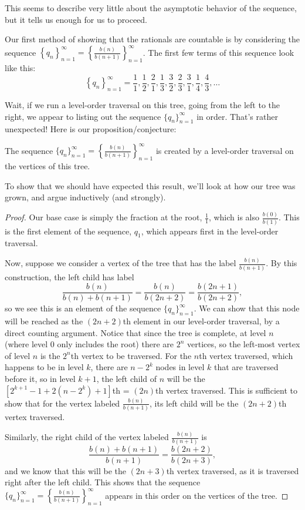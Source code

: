 \documentclass[12pt]{scrartcl}
\begin{document}
This seems to describe very little about the asymptotic behavior of the sequence, but it tells us enough for us to proceed.

Our first method of showing that the rationals are countable is by considering the sequence $\left\{q_n \right\}_{n=1}^\infty = \left\{\frac{b(n)}{b(n+1)}\right\}_{n=1}^\infty$. The first few terms of this sequence look like this:
\[
	\left\{q_n \right\}_{n=1}^\infty = \frac{1}{1},  \frac{1}{2},  \frac{2}{1},  \frac{1}{3},  \frac{3}{2},  \frac{2}{3}, \frac{3}{1}, \frac{1}{4}, \frac{4}{3}, \ldots
\]

Wait, if we run a level-order traversal on this tree, going from the left to the right, we appear to listing out the sequence $\{q_n\}_{n=1}^\infty$ in order. That's rather unexpected! Here is our proposition/conjecture:
\begin{theorem}
	The sequence $\{q_n\}_{n=1}^\infty = \left\{\frac{b(n)}{b(n+1)}\right\}_{n=1}^\infty$ is created by a level-order traversal on the vertices of this tree.
\end{theorem}

To show that we should have expected this result, we'll look at how our tree was grown, and argue inductively (and strongly).
\begin{proof}
	Our base case is simply the fraction at the root, $\frac{1}{1}$, which is also $\frac{b(0)}{b(1)}$. This is the first element of the sequence, $q_1$, which appears first in the level-order traversal.

	Now, suppose we consider a vertex of the tree that has the label $\frac{b(n)}{b(n+1)}$. By this construction, the left child has label
	\[
		\frac{b(n)}{b(n)+b(n+1)} = \frac{b(n)}{b(2n+2)} = \frac{b(2n+1)}{b(2n+2)},
	\]
	so we see this is an element of the sequence $\{q_n\}_{n=1}^\infty$. We can show that this node will be reached as the $(2n+2)$th element in our level-order traversal, by a direct counting argument. Notice that since the tree is complete, at level $n$ (where level 0 only includes the root) there are $2^n$ vertices, so the left-most vertex of level $n$ is the $2^n$th vertex to be traversed. For the $n$th vertex traversed, which happens to be in level $k$, there are $n - 2^k$ nodes in level $k$ that are traversed before it, so in level $k+1$, the left child of $n$ will be the $[2^{k+1} - 1 + 2(n - 2^k) + 1]$th = $(2n)$th vertex traversed. This is sufficient to show that for the vertex labeled $\frac{b(n)}{b(n+1)}$, its left child will be the $(2n+2)$th vertex traversed.

	Similarly, the right child of the vertex labeled $\frac{b(n)}{b(n+1)}$ is
	\[
		\frac{b(n)+b(n+1)}{b(n+1)} = \frac{b(2n+2)}{b(2n+3)},
	\]
	and we know that this will be the $(2n+3)$th vertex traversed, as it is traversed right after the left child. This shows that the sequence $\{q_n\}_{n=1}^\infty = \left\{\frac{b(n)}{b(n+1)}\right\}_{n=1}^\infty$ appears in this order on the vertices of the tree.
\end{proof}
\end{document}
